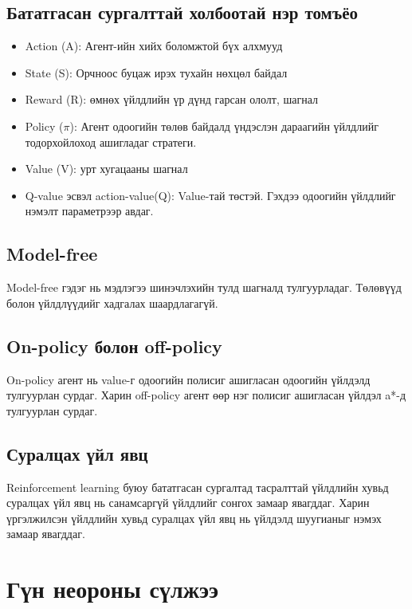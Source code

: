 \documentclass[12pt,A4]{report}
\begin{document}
\subsection{Бататгасан сургалттай холбоотай нэр томъёо}

\begin{itemize}
	\item Action (A): Агент-ийн хийх боломжтой бүх алхмууд
	\item State (S): Орчноос буцаж ирэх тухайн нөхцөл байдал
	\item Reward (R): өмнөх үйлдлийн үр дүнд гарсан ололт, шагнал
	\item Policy (\(\pi\)): Агент одоогийн төлөв байдалд үндэслэн дараагийн үйлдлийг тодорхойлоход ашигладаг стратеги. 
	\item Value (V): урт хугацааны шагнал
	\item Q-value эсвэл action-value(Q): Value-тай төстэй. Гэхдээ одоогийн үйлдлийг нэмэлт параметрээр авдаг.
\end{itemize}

\subsection{Model-free}

Model-free гэдэг нь мэдлэгээ шинэчлэхийн тулд шагналд тулгуурладаг. Төлөвүүд болон үйлдлүүдийг хадгалах шаардлагагүй. 

\subsection{On-policy болон off-policy}

On-policy агент нь value-г одоогийн полисиг ашигласан одоогийн үйлдэлд тулгуурлан сурдаг. Харин off-policy агент өөр нэг полисиг ашигласан үйлдэл a*-д тулгуурлан сурдаг.

\subsection{Суралцах үйл явц}

Reinforcement learning буюу бататгасан сургалтад тасралттай үйлдлийн хувьд суралцах үйл явц нь санамсаргүй үйлдлийг сонгох замаар явагддаг. Харин үргэлжилсэн үйлдлийн хувьд суралцах үйл явц нь үйлдэлд шуугианыг нэмэх замаар явагддаг.

\section{Гүн неороны сүлжээ}
\end{document}
